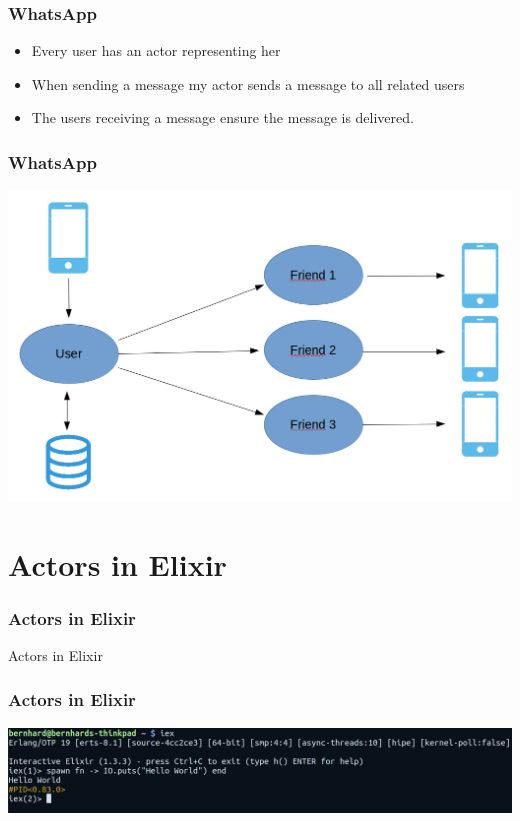 \documentclass{beamer}
\begin{document}
\begin{frame}
\frametitle{WhatsApp}
\begin{itemize}
\item Every user has an actor representing her
\item When sending a message my actor sends a message to all related users
\item The users receiving a message ensure the message is delivered.
\end{itemize}
\end{frame}


\begin{frame}
\frametitle{WhatsApp}
\includegraphics[width=0.95\linewidth]{./whatsapp_actor.png}
\end{frame}


\section{Actors in Elixir}

\begin{frame}
\frametitle{Actors in Elixir}
\Huge{\centerline{Actors in Elixir}}
\end{frame}


\begin{frame}
\frametitle{Actors in Elixir}
\includegraphics[width=1.2\linewidth]{./hello_elixir.jpg}
\end{frame}
\end{document}
